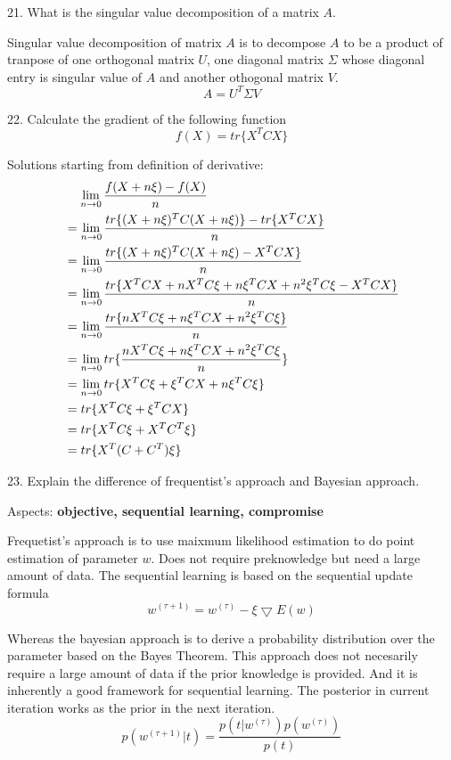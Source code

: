 \documentclass[11pt,a4paper]{article}
\newcommand{\BOLD}[1]{\textbf{#1}}
\begin{document}
21. What is the singular value decomposition of a matrix $A$. 

    Singular value decomposition of matrix $A$ is to decompose $A$ to be a product of tranpose of one orthogonal matrix $U$, one diagonal matrix $\Sigma$ whose diagonal entry is singular value of $A$ and another othogonal matrix $V$. 
    $$
     A = U^T \Sigma V
    $$

22. Calculate the gradient of the following function 
    $$
    f(X) = tr\{ X^T C X\}
    $$

    Solutions starting from definition of derivative:
\begin{align}
    & \hspace{0.4cm} \lim_{n \rightarrow 0} \frac{ f(X + n\xi) - f (X) }{n} \\
    &= \lim_{n \rightarrow 0}  \frac{tr\{ (X + n\xi)^T C (X + n\xi)\} -  tr\{ X^T C X\}}{n} \\
    &= \lim_{n \rightarrow 0} \frac{ tr\{ (X + n\xi)^T C (X + n\xi) - X^T C X\}}{n}  \\
    &= \lim_{n \rightarrow 0}  \frac{ tr\{ X^T CX + nX^TC\xi + n\xi^T CX + n^2\xi^TC\xi- X^T C X\}}{n}  \\
    &= \lim_{n \rightarrow 0} \frac{ tr\{ nX^TC\xi + n\xi^T CX + n^2\xi^TC\xi \}}{n}  \\
    &= \lim_{n \rightarrow 0}  tr\{ \frac{ nX^TC\xi + n\xi^T CX + n^2 \xi^T C \xi}{n} \} \\
    &= \lim_{n \rightarrow 0}  tr\{ X^TC\xi + \xi^T CX + n \xi^T C \xi \} \\
    &=  tr\{ X^TC\xi + \xi^T CX  \} \\
    &=  tr\{ X^TC\xi + X^TC^T \xi  \} \\
    &=  tr\{ X^T(C + C^T)\xi  \} 
\end{align}

23. Explain the difference of frequentist's approach and Bayesian approach.

    Aspects: \BOLD{objective, sequential learning, compromise}    

    Frequetist's approach is to use maixmum likelihood estimation to do point estimation of parameter $w$. Does not require preknowledge but need a large amount of data. The sequential learning is based on the sequential update formula
    $$
    w^{(\tau+1)} = w^{(\tau)} - \xi \bigtriangledown E(w)
    $$

    Whereas the bayesian approach is to derive a probability distribution over the parameter based on the Bayes Theorem. This approach does not necesarily require a large amount of data if the prior knowledge is provided. And it is inherently a good framework for sequential learning. The posterior in current iteration works as the prior in the next iteration. 
    $$
    p(w^{(\tau+1)}|t) = \frac{p(t|w^{(\tau)})p(w^{(\tau)})}{p(t)}
    $$
\end{document}
